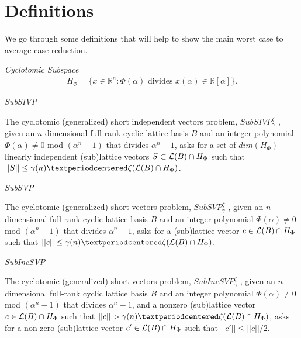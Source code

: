 \section{Definitions}
We go through some definitions that will help to show the main worst case to average case reduction.
\begin{definition}
	\textit{Cyclotomic Subspace}
	\begin{align*}
	H_\Phi = \{x \in \mathbb{R}^n:\Phi(\alpha)\text{ divides }x(\alpha) \in \mathbb{R}[\alpha]\}.
	\end{align*}
\end{definition}
\begin{definition}
	\textit{SubSIVP} 
	\par
	The cyclotomic (generalized) short independent vectors problem, $SubSIVP_\gamma^\zeta$ , given an $n$-dimensional full-rank cyclic lattice basis $B$ and an integer polynomial $\Phi(\alpha) \neq 0$ mod $(\alpha^n - 1)$ that divides $\alpha^n - 1$, asks for a set of $dim(H_\Phi)$ linearly independent
	(sub)lattice vectors $S \subset \mathcal{L}(B) \cap H_\Phi$ such that $||S|| \leq \gamma(n) · \zeta(\Latt(B) \cap H_\Phi )$.
\end{definition}
\begin{definition}
	\textit{SubSVP} 
	\par
	The cyclotomic (generalized) short vectors problem,
	$SubSVP_\gamma^\zeta$ , given an $n$-dimensional full-rank cyclic lattice basis $B$ and an integer polynomial $\Phi(\alpha) \neq 0$ mod $(\alpha^n - 1)$ that divides $\alpha^n - 1$, asks for a (sub)lattice vector $c \in \mathcal{L}(B) \cap H_\Phi$ such that $||c|| \leq \gamma(n) · \zeta(\Latt(B) \cap H_\Phi )$.
\end{definition}
\begin{definition}
	\textit{SubIncSVP} 
	\par
	The cyclotomic (generalized) short vectors problem,
	$SubIncSVP_\gamma^\zeta$ , given an $n$-dimensional full-rank cyclic lattice basis $B$ and an integer polynomial $\Phi(\alpha) \neq 0$ mod $(\alpha^n - 1)$ that divides $\alpha^n - 1$, and a nonzero (sub)lattice vector $c \in \mathcal{L}(B) \cap H_\Phi$ such that $||c|| > \gamma(n) · \zeta(\Latt(B) \cap H_\Phi )$, asks for a non-zero (sub)lattice vector $c' \in \mathcal{L}(B) \cap H_\Phi$ such that $||c'|| \leq ||c||/2$.
\end{definition}
